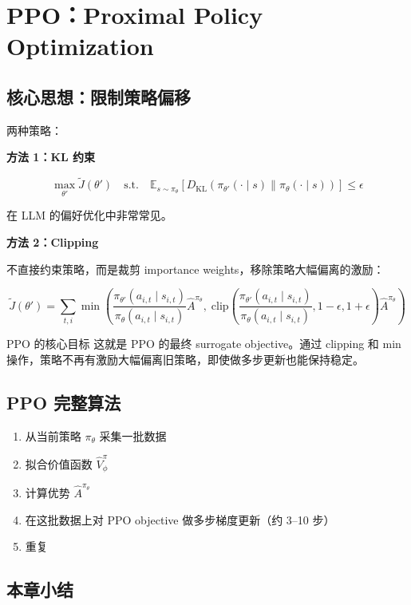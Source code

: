 \documentclass[a4paper]{article}
\begin{document}
\section{PPO：Proximal Policy Optimization}

\subsection{核心思想：限制策略偏移}

两种策略：

\textbf{方法 1：KL 约束}

$$\max_{\theta'} \tilde{J}(\theta') \quad \text{s.t.} \quad \mathbb{E}_{s \sim \pi_\theta}\left[D_{\mathrm{KL}}\left(\pi_{\theta'}(\cdot \mid s) \| \pi_\theta(\cdot \mid s)\right)\right] \leq \epsilon$$

在 LLM 的偏好优化中非常常见。

\textbf{方法 2：Clipping}

不直接约束策略，而是裁剪 importance weights，移除策略大幅偏离的激励：

$$\tilde{J}(\theta') = \sum_{t,i} \min\left(\frac{\pi_{\theta'}(a_{i,t} \mid s_{i,t})}{\pi_\theta(a_{i,t} \mid s_{i,t})} \hat{A}^{\pi_\theta}, \; \mathrm{clip}\left(\frac{\pi_{\theta'}(a_{i,t} \mid s_{i,t})}{\pi_\theta(a_{i,t} \mid s_{i,t})}, 1-\epsilon, 1+\epsilon\right) \hat{A}^{\pi_\theta}\right)$$

\begin{importantbox}{PPO 的核心目标}
这就是 PPO 的最终 surrogate objective。通过 clipping 和 min 操作，策略不再有激励大幅偏离旧策略，即使做多步更新也能保持稳定。
\end{importantbox}

\subsection{PPO 完整算法}

\begin{enumerate}
    \item 从当前策略 $\pi_\theta$ 采集一批数据
    \item 拟合价值函数 $\hat{V}^\pi_\phi$
    \item 计算优势 $\hat{A}^{\pi_\theta}$
    \item 在这批数据上对 PPO objective 做多步梯度更新（约 3--10 步）
    \item 重复
\end{enumerate}

\subsection{本章小结}
\end{document}
